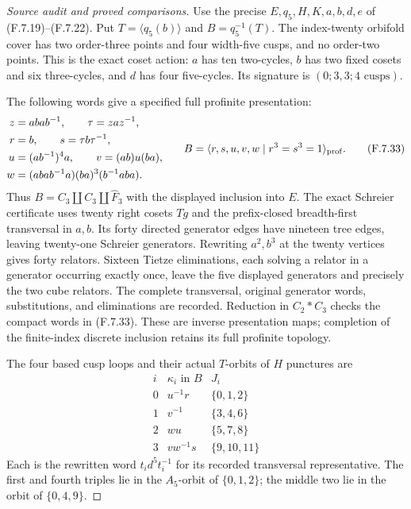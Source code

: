 \begin{proof}[Source audit and proved comparisons]
Use the precise $E,q_5,H,K,a,b,d,e$ of (F.7.19)--(F.7.22).
Put $T=\langle q_5(b)\rangle$ and $B=q_5^{-1}(T)$.
The index-twenty orbifold cover has two order-three
points and four width-five cusps, and no order-two
points. This is the exact coset action: $a$ has ten
two-cycles, $b$ has two fixed cosets and six three-cycles,
and $d$ has four five-cycles. Its signature is
$(0;3,3;4\text{ cusps})$.

The following words give a specified full profinite
presentation:
\[
 \begin{split}
 z&=aba b^{-1},\qquad \tau=zaz^{-1},\\
 r&=b,\qquad s=\tau b\tau^{-1},\\
 u&=(ab^{-1})^4a,\qquad v=(ab)u(ba),\\
 w&=(aba b^{-1}a)(ba)^3(b^{-1}aba).
 \end{split}
 \qquad
 B=\langle r,s,u,v,w\mid r^3=s^3=1\rangle_{\rm prof}.
                                                               \tag{F.7.33}
\]
Thus $B=C_3\amalg C_3\amalg\widehat F_3$ with the
displayed inclusion into $E$. The exact Schreier
certificate uses twenty right cosets $Tg$ and the
prefix-closed breadth-first transversal in $a,b$.
Its forty directed generator edges have nineteen
tree edges, leaving twenty-one Schreier generators.
Rewriting $a^2,b^3$ at the twenty vertices gives
forty relators. Sixteen Tietze eliminations, each
solving a relator in a generator occurring exactly
once, leave the five displayed generators and
precisely the two cube relators.
The complete transversal, original generator words,
substitutions, and eliminations are recorded.
Reduction in $C_2*C_3$ checks the compact words in
(F.7.33). These are inverse presentation maps;
completion of the finite-index discrete inclusion
retains its full profinite topology.

The four based cusp loops and their actual
$T$-orbits of $H$ punctures are
\[
 \begin{array}{c|c|c}
 i&\kappa_i\text{ in }B&J_i\\ \hline
 0&u^{-1}r&\{0,1,2\}\\
 1&v^{-1}&\{3,4,6\}\\
 2&wu&\{5,7,8\}\\
 3&vw^{-1}s&\{9,10,11\}
 \end{array}                                                \tag{F.7.34}
\]
Each is the rewritten word $t_i d^5t_i^{-1}$
for its recorded transversal representative.
The first and fourth triples lie in the
$A_5$-orbit of $\{0,1,2\}$; the middle two lie
in the orbit of $\{0,4,9\}$.


\end{proof}

